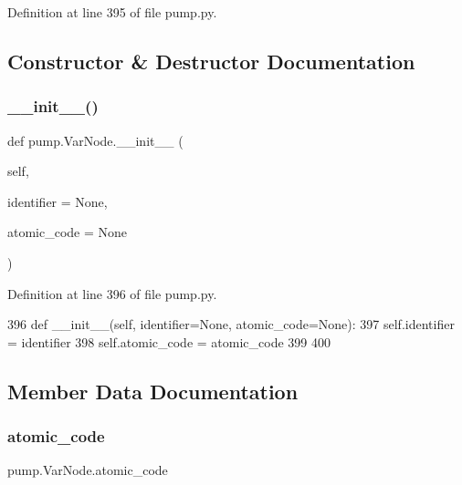 Definition at line 395 of file pump.\+py.



\subsection{Constructor \& Destructor Documentation}
\mbox{\label{classpump_1_1VarNode_adf79bf21b1db5367792a4ac91f94a756}} 
\subsubsection{\texorpdfstring{\+\_\+\+\_\+init\+\_\+\+\_\+()}{\_\_init\_\_()}}
{\footnotesize\ttfamily def pump.\+Var\+Node.\+\_\+\+\_\+init\+\_\+\+\_\+ (\begin{DoxyParamCaption}\item[{}]{self,  }\item[{}]{identifier = {\ttfamily None},  }\item[{}]{atomic\+\_\+code = {\ttfamily None} }\end{DoxyParamCaption})}



Definition at line 396 of file pump.\+py.


\begin{DoxyCode}
396   \textcolor{keyword}{def }\_\_init\_\_(self, identifier=None, atomic\_code=None):
397     self.identifier = identifier
398     self.atomic\_code = atomic\_code
399 
400 
\end{DoxyCode}


\subsection{Member Data Documentation}
\mbox{\label{classpump_1_1VarNode_ad6bef6a8577b994fbe9ccddf3c82d2fc}} 
\subsubsection{\texorpdfstring{atomic\+\_\+code}{atomic\_code}}
{\footnotesize\ttfamily pump.\+Var\+Node.\+atomic\+\_\+code}



